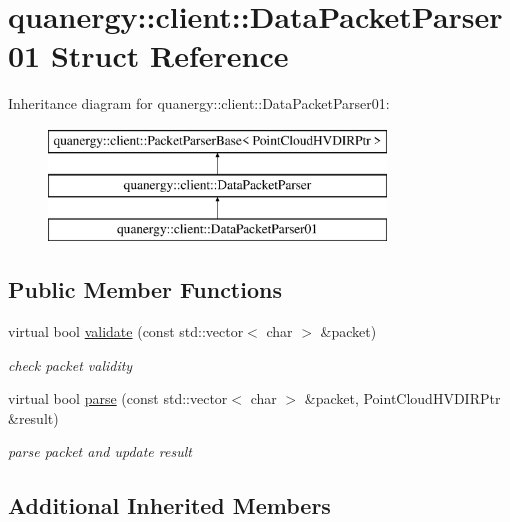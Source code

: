 \hypertarget{structquanergy_1_1client_1_1DataPacketParser01}{\section{quanergy\-:\-:client\-:\-:Data\-Packet\-Parser01 Struct Reference}
\label{structquanergy_1_1client_1_1DataPacketParser01}
}
Inheritance diagram for quanergy\-:\-:client\-:\-:Data\-Packet\-Parser01\-:\begin{figure}[H]
\begin{center}
\leavevmode
\includegraphics[height=3.000000cm]{structquanergy_1_1client_1_1DataPacketParser01}
\end{center}
\end{figure}
\subsection*{Public Member Functions}
\begin{DoxyCompactItemize}
\item 
virtual bool \hyperlink{structquanergy_1_1client_1_1DataPacketParser01_a0a28a9b2fecdd1cbb0afb8df05e1f90e}{validate} (const std\-::vector$<$ char $>$ \&packet)
\begin{DoxyCompactList}\small\item\em check packet validity \end{DoxyCompactList}\item 
virtual bool \hyperlink{structquanergy_1_1client_1_1DataPacketParser01_a5873c64ebd1b6261e6c6ec8694ab0061}{parse} (const std\-::vector$<$ char $>$ \&packet, Point\-Cloud\-H\-V\-D\-I\-R\-Ptr \&result)
\begin{DoxyCompactList}\small\item\em parse packet and update result \end{DoxyCompactList}\end{DoxyCompactItemize}
\subsection*{Additional Inherited Members}


